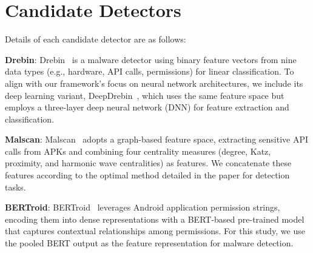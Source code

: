 


\section{Candidate Detectors}
\label{candidate}

Details of each candidate detector are as follows:

\textbf{Drebin}: Drebin~\cite{Arpdrebin} is a malware detector using binary feature vectors from nine data types (e.g., hardware, API calls, permissions) for linear classification. To align with our framework's focus on neural network architectures, we include its deep learning variant, DeepDrebin~\cite{Grossedeepdrebin}, which uses the same feature space but employs a three-layer deep neural network (DNN) for feature extraction and classification.

\textbf{Malscan}: Malscan~\cite{malscan} adopts a graph-based feature space, extracting sensitive API calls from APKs and combining four centrality measures (degree, Katz, proximity, and harmonic wave centralities) as features. We concatenate these features according to the optimal method detailed in the paper for detection tasks.

\textbf{BERTroid}: BERTroid~\cite{bertroid} leverages Android application permission strings, encoding them into dense representations with a BERT-based pre-trained model that captures contextual relationships among permissions. For this study, we use the pooled BERT output as the feature representation for malware detection.
    


